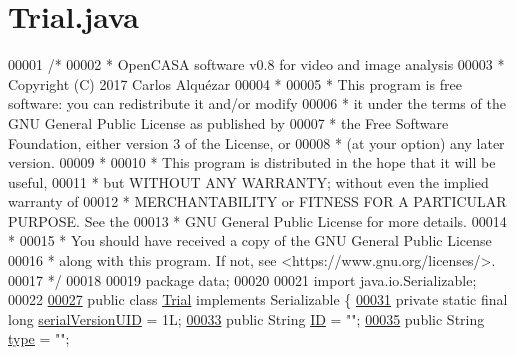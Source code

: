 \hypertarget{_trial_8java_source}{}\section{Trial.\+java}
\label{_trial_8java_source}

\begin{DoxyCode}
00001 \textcolor{comment}{/*}
00002 \textcolor{comment}{ *   OpenCASA software v0.8 for video and image analysis}
00003 \textcolor{comment}{ *   Copyright (C) 2017  Carlos Alquézar}
00004 \textcolor{comment}{ *}
00005 \textcolor{comment}{ *   This program is free software: you can redistribute it and/or modify}
00006 \textcolor{comment}{ *   it under the terms of the GNU General Public License as published by}
00007 \textcolor{comment}{ *   the Free Software Foundation, either version 3 of the License, or}
00008 \textcolor{comment}{ *   (at your option) any later version.}
00009 \textcolor{comment}{ *}
00010 \textcolor{comment}{ *   This program is distributed in the hope that it will be useful,}
00011 \textcolor{comment}{ *   but WITHOUT ANY WARRANTY; without even the implied warranty of}
00012 \textcolor{comment}{ *   MERCHANTABILITY or FITNESS FOR A PARTICULAR PURPOSE.  See the}
00013 \textcolor{comment}{ *   GNU General Public License for more details.}
00014 \textcolor{comment}{ *}
00015 \textcolor{comment}{ *   You should have received a copy of the GNU General Public License}
00016 \textcolor{comment}{ *   along with this program.  If not, see <https://www.gnu.org/licenses/>.}
00017 \textcolor{comment}{*/}    
00018 
00019 \textcolor{keyword}{package }data;
00020 
00021 \textcolor{keyword}{import} java.io.Serializable;
00022 
\hypertarget{_trial_8java_source_l00027}{}\hyperlink{classdata_1_1_trial}{00027} \textcolor{keyword}{public} \textcolor{keyword}{class }\hyperlink{classdata_1_1_trial}{Trial} \textcolor{keyword}{implements} Serializable \{
\hypertarget{_trial_8java_source_l00031}{}\hyperlink{classdata_1_1_trial_a3238d314ecdee14d2966760945d00c3b}{00031}   \textcolor{keyword}{private} \textcolor{keyword}{static} \textcolor{keyword}{final} \textcolor{keywordtype}{long} \hyperlink{classdata_1_1_trial_a3238d314ecdee14d2966760945d00c3b}{serialVersionUID} = 1L;
\hypertarget{_trial_8java_source_l00033}{}\hyperlink{classdata_1_1_trial_a317298c3409575f71e43acd3f73ce295}{00033}   \textcolor{keyword}{public} String \hyperlink{classdata_1_1_trial_a317298c3409575f71e43acd3f73ce295}{ID} = \textcolor{stringliteral}{""};
\hypertarget{_trial_8java_source_l00035}{}\hyperlink{classdata_1_1_trial_a0b86e44425dbe3c9d866aa273f87828a}{00035}   \textcolor{keyword}{public} String \hyperlink{classdata_1_1_trial_a0b86e44425dbe3c9d866aa273f87828a}{type} = \textcolor{stringliteral}{""};

\end{DoxyCode}
